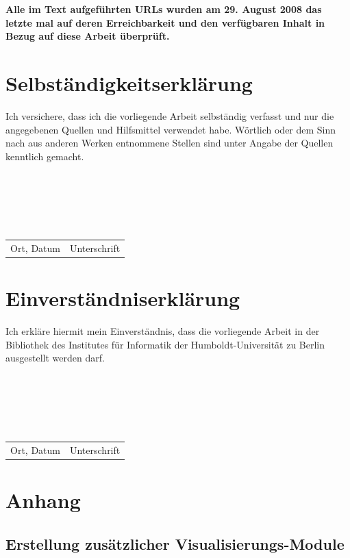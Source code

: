 \newpage
{}



\textbf{Alle im Text aufgeführten URLs wurden am 29. August 2008 das letzte mal auf deren Erreichbarkeit und den verfügbaren Inhalt in Bezug auf diese Arbeit überprüft.}

\newpage
{}
\section*{Selbständigkeitserklärung}

Ich versichere, dass ich die vorliegende Arbeit selbständig verfasst und nur die angegebenen Quellen und Hilfsmittel verwendet habe. Wörtlich oder dem Sinn nach aus anderen Werken entnommene Stellen sind unter Angabe der Quellen kenntlich gemacht. \\ \\ \\ \\ \\ \\

\begin{tabular}{l r}
	Ort, Datum & Unterschrift
\end{tabular}

\section*{Einverständniserklärung}

Ich erkläre hiermit mein Einverständnis, dass die vorliegende Arbeit in der Bibliothek des Institutes für Informatik der Humboldt-Universität zu Berlin ausgestellt werden darf.\\ \\ \\ \\ \\ \\

\begin{tabular}{l r}
	Ort, Datum & Unterschrift
\end{tabular}


\newpage
\section{Anhang}
\subsection{Erstellung zusätzlicher Visualisierungs-Module}\label{sec:VisualisierungsModule}


